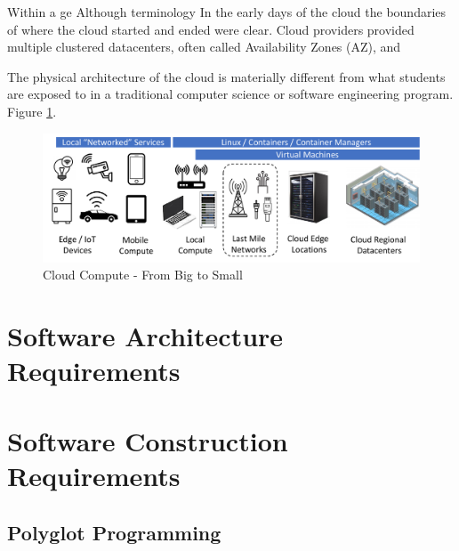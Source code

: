 \documentclass[conference]{IEEEconf}
\begin{document}
Within a ge
Although terminology In the early days of the cloud the boundaries of where the cloud started and ended were clear. Cloud providers provided multiple clustered datacenters, often called Availability Zones (AZ), and  

The physical architecture of the cloud is materially different from what students are exposed to in a traditional computer science or software engineering program.  Figure \ref{fig:CloudTopo}.

\begin{figure}[t!]
	\includegraphics[width=\textwidth]{images/CloudTopo2.pdf}	
	\caption{Cloud Compute - From Big to Small}
	\label{fig:CloudTopo}
\end{figure}

\section{Software Architecture Requirements}
\label{sec:SoftwareArchitecture}

\section{Software Construction Requirements}
\label{sec:SoftwareConstruction}

\subsection{Polyglot Programming}
\label{subsec:Polyglot}




\end{document}
